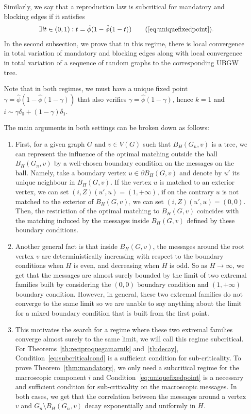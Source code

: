 \documentclass[11pt]{article}
\begin{document}
Similarly, we say that a reproduction law is subcritical for mandatory and blocking edges if it satisfies
\begin{equation}
    \exists!t \in (0,1): t=\hat{\phi}(1-\hat\phi(1-t)) \tag{\ref{eq:uniquefixedpoint}}.
\end{equation}
In the second subsection, we prove that in this regime, there is local convergence in total variation of mandatory and blocking edges along with local convergence in total variation of a sequence of random graphs to the corresponding UBGW tree.

Note that in both regimes, we must have a unique fixed point $\gamma= \hat{\phi}\left( 1- \hat{\phi}(1-\gamma)\right)$ that also verifies $\gamma = \hat{\phi}(1-\gamma)$, hence $k=1$ and $i \sim \gamma \delta_0 + (1-\gamma)\delta_1$.

\bigskip

The main arguments in both settings can be broken down as follows:
\begin{enumerate}
    \item First, for a given graph $G$ and $v \in V(G)$ such that $B_H(G_n,v)$ is a tree, we can represent the influence of the optimal matching outside the ball $B_H(G_n,v)$ by a well-chosen boundary condition on the messages on the ball. Namely, take a boundary vertex $u \in \partial B_H(G,v)$ and denote by $u'$ its unique neighbour in $B_H(G,v)$. If the vertex $u$ is matched to an exterior vertex, we can set $(i,Z)(u',u) = (1,  + \infty)$, if on the contrary $u$ is not matched to the exterior of $B_H(G,v)$, we can set $(i,Z)(u',u) = (0,0)$. Then, the restriction of the optimal matching to $B_H(G,v)$ coincides with the matching induced by the messages inside $B_H(G,v)$ defined by these boundary conditions.
    \item Another general fact is that inside $B_H(G,v)$, the messages around the root vertex $v$ are deterministically increasing with respect to the boundary conditions when $H$ is even, and decreasing when $H$ is odd. So as $H \rightarrow \infty$, we get that the messages are almost surely bounded by the limit of two extremal families built by considering the $(0,0)$ boundary condition and $(1, +\infty)$ boundary condition. However, in general, these two extremal families do not converge to the same limit so we are unable to say anything about the limit for a mixed boundary condition that is built from the first point.
    \item This motivates the search for a regime where these two extremal families converge almost surely to the same limit, we will call this regime subcritical. For Theorems~\ref{th:reciproquegamarnik} and~\ref{th:decay}, Condition~\ref{eq:subcriticalcond} is a sufficient condition for sub-criticality. To prove Theorem~\ref{thm:mandatory}, we only need a subcritical regime for the macroscopic component $i$ and Condition~\ref{eq:uniquefixedpoint} is a necessary and sufficient condition for sub-criticality on the macroscopic messages. In both cases, we get that the correlation between the messages around a vertex $v$ and $G_n \setminus B_H(G_n,v)$ decay exponentially and uniformly in $H$. 
\end{enumerate}
\end{document}

